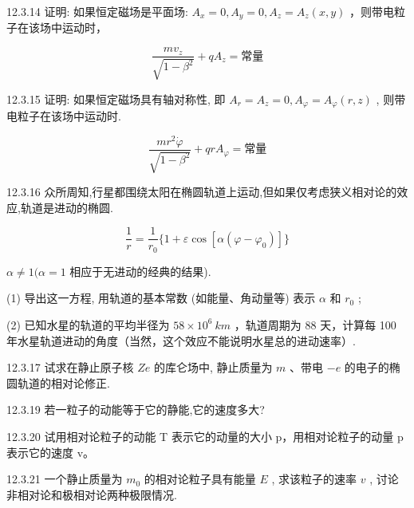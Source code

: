 \begin{problem}{12.3.14}
证明: 如果恒定磁场是平面场: $A_{x}=0, A_{y}=0, A_{z}=A_{z}(x, y)$ ，则带电粒子在该场中运动时，

\[
\frac {m v _ {z}}{\sqrt {1 - \beta^ {2}}} + q A _ {z} = \text {常量}
\]
\end{problem}
\clearpage


\begin{problem}{12.3.15}
证明: 如果恒定磁场具有轴对称性, 即 $A_{r} = A_{z} = 0, A_{\varphi} = A_{\varphi}(r, z)$ , 则带电粒子在该场中运动时.

\[
\frac {m r ^ {2} \dot {\varphi}}{\sqrt {1 - \beta^ {2}}} + q r A _ {\varphi} = \text {常量}
\]
\end{problem}
\clearpage


\begin{problem}{12.3.16}
众所周知,行星都围绕太阳在椭圆轨道上运动,但如果仅考虑狭义相对论的效应,轨道是进动的椭圆.

\[
\frac {1}{r} = \frac {1}{r _ {0}} \{1 + \varepsilon \cos [ \alpha (\varphi - \varphi_ {0}) ] \}
\]

$\alpha\neq1(\alpha=1$ 相应于无进动的经典的结果).

(1) 导出这一方程, 用轨道的基本常数 (如能量、角动量等) 表示 $\alpha$ 和 $r_0$ ;

(2) 已知水星的轨道的平均半径为 $58 \times 10^{6} ~km$ ，轨道周期为 88 天，计算每 100 年水星轨道进动的角度（当然，这个效应不能说明水星总的进动速率）.
\end{problem}
\clearpage


\begin{problem}{12.3.17}
试求在静止原子核 $Ze$ 的库仑场中, 静止质量为 $m$ 、带电 $-e$ 的电子的椭圆轨道的相对论修正.
\end{problem}
\clearpage


\begin{problem}{12.3.19}
若一粒子的动能等于它的静能,它的速度多大?
\end{problem}
\clearpage


\begin{problem}{12.3.20}
试用相对论粒子的动能 T 表示它的动量的大小 p，用相对论粒子的动量 p 表示它的速度 v。
\end{problem}
\clearpage


\begin{problem}{12.3.21}
一个静止质量为 $m_0$ 的相对论粒子具有能量 $E$ , 求该粒子的速率 $v$ , 讨论非相对论和极相对论两种极限情况.
\end{problem}
\clearpage


